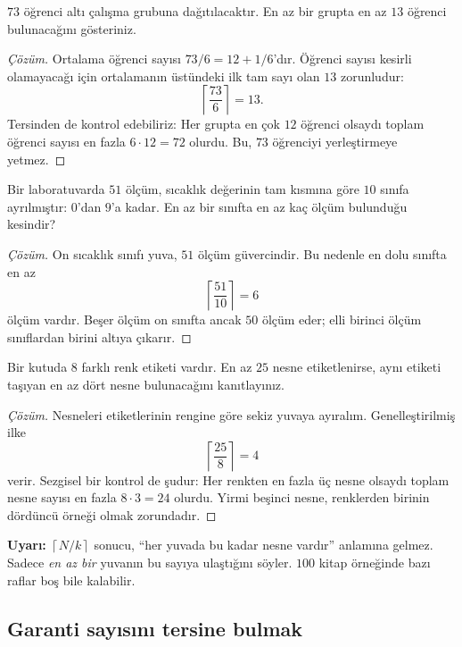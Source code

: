 \begin{example}
$73$ öğrenci altı çalışma grubuna dağıtılacaktır. En az bir grupta en az $13$ öğrenci bulunacağını gösteriniz.
\end{example}
\begin{proof}[Çözüm]
Ortalama öğrenci sayısı $73/6=12+1/6$'dır. Öğrenci sayısı kesirli olamayacağı için ortalamanın üstündeki ilk tam sayı olan $13$ zorunludur:
\[
\left\lceil\frac{73}{6}\right\rceil=13.
\]
Tersinden de kontrol edebiliriz: Her grupta en çok $12$ öğrenci olsaydı toplam öğrenci sayısı en fazla $6\cdot12=72$ olurdu. Bu, $73$ öğrenciyi yerleştirmeye yetmez.
\end{proof}

\begin{example}
Bir laboratuvarda $51$ ölçüm, sıcaklık değerinin tam kısmına göre $10$ sınıfa ayrılmıştır: $0$'dan $9$'a kadar. En az bir sınıfta en az kaç ölçüm bulunduğu kesindir?
\end{example}
\begin{proof}[Çözüm]
On sıcaklık sınıfı yuva, $51$ ölçüm güvercindir. Bu nedenle en dolu sınıfta en az
\[
\left\lceil\frac{51}{10}\right\rceil=6
\]
ölçüm vardır. Beşer ölçüm on sınıfta ancak $50$ ölçüm eder; elli birinci ölçüm sınıflardan birini altıya çıkarır.
\end{proof}

\begin{example}
Bir kutuda $8$ farklı renk etiketi vardır. En az $25$ nesne etiketlenirse, aynı etiketi taşıyan en az dört nesne bulunacağını kanıtlayınız.
\end{example}
\begin{proof}[Çözüm]
Nesneleri etiketlerinin rengine göre sekiz yuvaya ayıralım. Genelleştirilmiş ilke
\[
\left\lceil\frac{25}{8}\right\rceil=4
\]
verir. Sezgisel bir kontrol de şudur: Her renkten en fazla üç nesne olsaydı toplam nesne sayısı en fazla $8\cdot3=24$ olurdu. Yirmi beşinci nesne, renklerden birinin dördüncü örneği olmak zorundadır.
\end{proof}

\textbf{Uyarı:} $\left\lceil N/k\right\rceil$ sonucu, ``her yuvada bu kadar nesne vardır'' anlamına gelmez. Sadece \emph{en az bir} yuvanın bu sayıya ulaştığını söyler. $100$ kitap örneğinde bazı raflar boş bile kalabilir.

\subsection{Garanti sayısını tersine bulmak}

